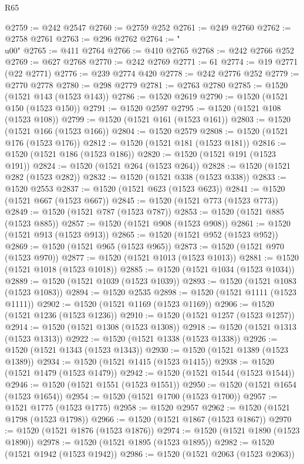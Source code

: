 \begin{lexlean}{R65}
\begin{coremodule}
{@2759 := @242 @2547
@2760 := @2759 @252
@2761 := @249 @2760
@2762 := @2758 @2761
@2763 := @296 @2762
@2764 := "\\u00"
@2765 := @411 @2764
@2766 := @410 @2765
@2768 := @242 @2766 @252
@2769 := @627 @2768
@2770 := @242 @2769
@2771 := 61
@2774 := @19 @2771 (@22 @2771)
@2776 := @239 @2774 @420
@2778 := @242 @2776 @252
@2779 := @2770 @2778
@2780 := @298 @2779
@2781 := @2763 @2780
@2785 := @1520 (@1521 @143 (@1523 @143))
@2786 := @1520 @2619
@2790 := @1520 (@1521 @150 (@1523 @150))
@2791 := @1520 @2597
@2795 := @1520 (@1521 @108 (@1523 @108))
@2799 := @1520 (@1521 @161 (@1523 @161))
@2803 := @1520 (@1521 @166 (@1523 @166))
@2804 := @1520 @2579
@2808 := @1520 (@1521 @176 (@1523 @176))
@2812 := @1520 (@1521 @181 (@1523 @181))
@2816 := @1520 (@1521 @186 (@1523 @186))
@2820 := @1520 (@1521 @191 (@1523 @191))
@2824 := @1520 (@1521 @264 (@1523 @264))
@2828 := @1520 (@1521 @282 (@1523 @282))
@2832 := @1520 (@1521 @338 (@1523 @338))
@2833 := @1520 @2553
@2837 := @1520 (@1521 @623 (@1523 @623))
@2841 := @1520 (@1521 @667 (@1523 @667))
@2845 := @1520 (@1521 @773 (@1523 @773))
@2849 := @1520 (@1521 @787 (@1523 @787))
@2853 := @1520 (@1521 @885 (@1523 @885))
@2857 := @1520 (@1521 @908 (@1523 @908))
@2861 := @1520 (@1521 @913 (@1523 @913))
@2865 := @1520 (@1521 @952 (@1523 @952))
@2869 := @1520 (@1521 @965 (@1523 @965))
@2873 := @1520 (@1521 @970 (@1523 @970))
@2877 := @1520 (@1521 @1013 (@1523 @1013))
@2881 := @1520 (@1521 @1018 (@1523 @1018))
@2885 := @1520 (@1521 @1034 (@1523 @1034))
@2889 := @1520 (@1521 @1039 (@1523 @1039))
@2893 := @1520 (@1521 @1083 (@1523 @1083))
@2894 := @1520 @2535
@2898 := @1520 (@1521 @1111 (@1523 @1111))
@2902 := @1520 (@1521 @1169 (@1523 @1169))
@2906 := @1520 (@1521 @1236 (@1523 @1236))
@2910 := @1520 (@1521 @1257 (@1523 @1257))
@2914 := @1520 (@1521 @1308 (@1523 @1308))
@2918 := @1520 (@1521 @1313 (@1523 @1313))
@2922 := @1520 (@1521 @1338 (@1523 @1338))
@2926 := @1520 (@1521 @1343 (@1523 @1343))
@2930 := @1520 (@1521 @1389 (@1523 @1389))
@2934 := @1520 (@1521 @1415 (@1523 @1415))
@2938 := @1520 (@1521 @1479 (@1523 @1479))
@2942 := @1520 (@1521 @1544 (@1523 @1544))
@2946 := @1520 (@1521 @1551 (@1523 @1551))
@2950 := @1520 (@1521 @1654 (@1523 @1654))
@2954 := @1520 (@1521 @1700 (@1523 @1700))
@2957 := @1521 @1775 (@1523 @1775)
@2958 := @1520 @2957
@2962 := @1520 (@1521 @1798 (@1523 @1798))
@2966 := @1520 (@1521 @1867 (@1523 @1867))
@2970 := @1520 (@1521 @1876 (@1523 @1876))
@2974 := @1520 (@1521 @1890 (@1523 @1890))
@2978 := @1520 (@1521 @1895 (@1523 @1895))
@2982 := @1520 (@1521 @1942 (@1523 @1942))
@2986 := @1520 (@1521 @2063 (@1523 @2063))
}
\end{coremodule}
\end{lexlean}
